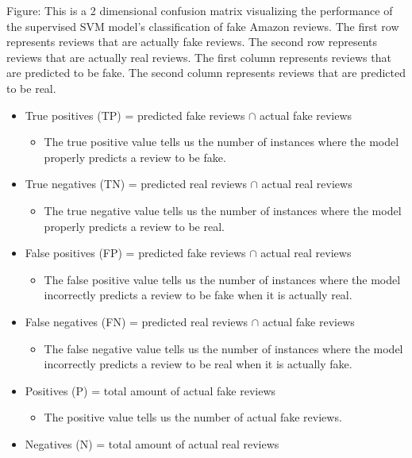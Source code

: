 \documentclass[12pt]{article}
\begin{document}
\bigskip

\caption{Figure: This is a 2 dimensional confusion matrix visualizing the performance of the supervised SVM model's classification of fake Amazon reviews. The first row represents reviews that are actually fake reviews. The second row represents reviews that are actually real reviews. The first column represents reviews that are predicted to be fake. The second column represents reviews that are predicted to be real.}

\bigskip

\begin{itemize}
  \item True positives (TP) = predicted fake reviews $\cap$ actual fake reviews
  \begin{itemize}
    \item{The true positive value tells us the number of instances where the model properly predicts a review to be fake.}
  \end{itemize}
  \item True negatives (TN) = predicted real reviews $\cap$ actual real reviews
  \begin{itemize}
    \item{The true negative value tells us the number of instances where the model properly predicts a review to be real.}
  \end{itemize}
  \item False positives (FP) = predicted fake reviews $\cap$ actual real reviews
  \begin{itemize}
    \item{The false positive value tells us the number of instances where the model incorrectly predicts a review to be fake when it is actually real.}
  \end{itemize}
  \item False negatives (FN) = predicted real reviews $\cap$ actual fake reviews
    \begin{itemize}
    \item{The false negative value tells us the number of instances where the model incorrectly predicts a review to be real when it is actually fake.}
  \end{itemize}
  \item Positives (P) = total amount of actual fake reviews
    \begin{itemize}
    \item{The positive value tells us the number of actual fake reviews.}
  \end{itemize}
  \item Negatives (N) = total amount of actual real reviews

\end{itemize}
\end{document}
